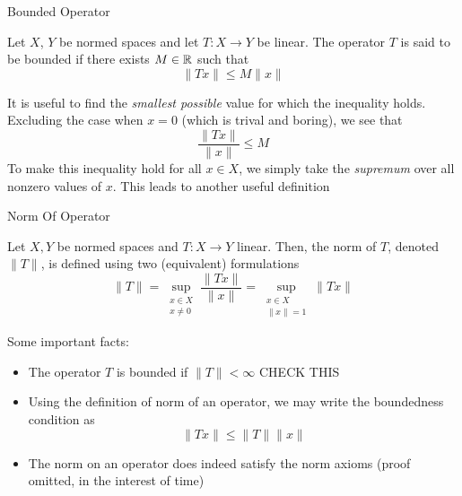 \documentclass[10pt]{beamer}
\begin{document}
		\begin{frame}{Bounded Operator}
				\begin{definition}
						Let $X$, $Y$ be normed spaces and let $T: X\to Y$ be linear. The operator $T$ is said to be \alert{bounded} if there exists $M\in\mathbb{R}$ such that 
						\begin{equation*}
								\|Tx\| \leq M\|x\|
						\end{equation*}
				\end{definition}

				It is useful to find the \emph{smallest possible} value for which the inequality holds. Excluding the case when $x = 0$ (which is trival and boring), we see that 
				\begin{equation*}
						\frac{\|Tx\|}{\|x\|} \leq M
				\end{equation*}
				To make this inequality hold for all $x\in X$, we simply take the \emph{supremum} over all nonzero values of $x$. This leads to another useful definition 
		\end{frame}

		\begin{frame}{Norm Of Operator}
				\begin{definition}
						Let $X,Y$ be normed spaces and $T: X\to Y$ linear. Then, the \alert{norm} of $T$, denoted $\|T\|$, is defined using two (equivalent) formulations 
						\begin{equation*}
								\|T\| = \sup_{\substack{x\in X \\ x \neq 0}} \frac{\|Tx\|}{\|x\|} = \sup_{\substack{x\in X \\ \|x\| = 1}} \|Tx\|
						\end{equation*}
				\end{definition}
				Some important facts: 
				\begin{itemize}
						\item<2-> The operator $T$ is bounded if $\|T\| < \infty$ CHECK THIS 
						\item<3-> Using the definition of norm of an operator, we may write the boundedness condition as 
								\begin{equation*}
										\|Tx\| \leq \|T\|\|x\|
								\end{equation*}
						\item<4-> The norm on an operator does indeed satisfy the norm axioms (proof omitted, in the interest of time)
				\end{itemize}
		\end{frame}
\end{document}
